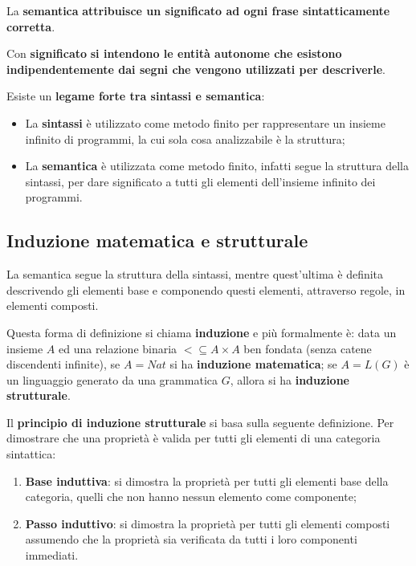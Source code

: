 \documentclass[a4paper]{article}
\begin{document}
	\noindent
	\begin{boxdef}
		La \textcolor{Red3}{\textbf{semantica}} \textbf{attribuisce un significato ad ogni frase sintatticamente corretta}.
	\end{boxdef}
	\begin{boxdef}
		Con \textcolor{Red3}{\textbf{significato}} \textbf{si intendono le entità autonome che esistono indipendentemente dai segni che vengono utilizzati per descriverle}.
	\end{boxdef}

	\noindent
	Esiste un \textbf{legame forte tra sintassi e semantica}:
	\begin{itemize}
		\item La \textbf{sintassi} è utilizzato come metodo finito per rappresentare un insieme infinito di programmi, la cui sola cosa analizzabile è la struttura;
		\item La \textbf{semantica} è utilizzata come metodo finito, infatti segue la struttura della sintassi, per dare significato a tutti gli elementi dell'insieme infinito dei programmi.
	\end{itemize}\newpage

	\subsection{Induzione matematica e strutturale}

	La semantica segue la struttura della sintassi, mentre quest'ultima è definita descrivendo gli elementi base e componendo questi elementi, attraverso regole, in elementi composti.\newline
	
	\begin{boxdef}
		Questa forma di definizione si chiama \textcolor{Red3}{\textbf{induzione}} e più formalmente è: data un insieme $A$ ed una relazione binaria $< \subseteq A \times A$ ben fondata (senza catene discendenti infinite), se $A = Nat$ si ha \textbf{induzione matematica}; se $A = L\left(G\right)$ è un linguaggio generato da una grammatica $G$, allora si ha \textbf{induzione strutturale}.
	\end{boxdef}\:\newline

	\noindent
	\begin{boxdef}
		Il \textcolor{Red3}{\textbf{principio di induzione strutturale}} si basa sulla seguente definizione. Per dimostrare che una proprietà è valida per tutti gli elementi di una categoria sintattica:
		\begin{enumerate}
			\item \textbf{Base induttiva}: si dimostra la proprietà per tutti gli elementi base della categoria, quelli che non hanno nessun elemento come componente;
			\item \textbf{Passo induttivo}: si dimostra la proprietà per tutti gli elementi composti assumendo che la proprietà sia verificata da tutti i loro componenti immediati.
		\end{enumerate}
	\end{boxdef}\newpage
\end{document}
